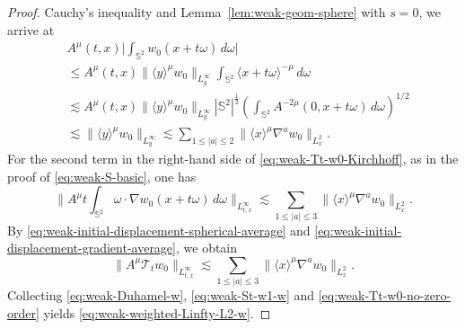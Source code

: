 \documentclass[11pt,twoside]{article}
\def\f{\frac}
\def\ls{\lesssim}
\newcommand{\Sph}{\mathbb{S}^2}
\theoremstyle{plain}
\theoremstyle{definition}
\theoremstyle{assumption}
\numberwithin{equation}{section}
\begin{document}
\begin{proof}
				Cauchy's inequality and Lemma~\ref{lem:weak-geom-sphere} with \(s=0\),
				we arrive at
				\begin{equation}
					\label{eq:weak-initial-displacement-spherical-average}
					\begin{aligned}
						&
						A^\mu(t,x)
						\big|
						\int_{\mathbb S^2}
						w_0(x+t\omega)\,d\omega
						\big|
						\\
						&\le
						A^\mu(t,x)
						\|\langle y\rangle^\mu w_0\|_{L^\infty_y}
						\int_{\mathbb S^2}
						\langle x+t\omega\rangle^{-\mu}\,d\omega
						\\
						&\lesssim
						A^\mu(t,x)
						\|\langle y\rangle^\mu w_0\|_{L^\infty_y}
						|\Sph|^{\f12}
						\left(
						\int_{\mathbb S^2}
						A^{-2\mu}(0,x+t\omega)\,d\omega
						\right)^{1/2}
						\\
						&\ls
						\|\langle y\rangle^\mu w_0\|_{L^\infty_y}
						\ls
						\sum_{1\le |a|\le2}
						\|\langle x\rangle^\mu\nabla^a w_0\|_{L^2_x}.
					\end{aligned}
				\end{equation}
				For the second term in the right-hand side of
				\eqref{eq:weak-Tt-w0-Kirchhoff}, as in the proof of
				\eqref{eq:weak-S-basic}, one has
				\begin{equation}
					\label{eq:weak-initial-displacement-gradient-average}
					\big\|
					A^\mu
					t
					\int_{\mathbb S^2}
					\omega\cdot\nabla w_0(x+t\omega)\,d\omega
					\big\|_{L^\infty_{t,x}}
					\ls
					\sum_{1\le |a|\le3}
					\|\langle x\rangle^\mu\nabla^a w_0\|_{L^2_x}.
				\end{equation}
				By \eqref{eq:weak-initial-displacement-spherical-average} and
				\eqref{eq:weak-initial-displacement-gradient-average}, we obtain
				\begin{equation}
					\label{eq:weak-Tt-w0-no-zero-order}
					\|A^\mu\mathcal T_t w_0\|_{L^\infty_{t,x}}
					\ls
					\sum_{1\le |a|\le3}
					\|\langle x\rangle^\mu\nabla^a w_0\|_{L^2_x}.
				\end{equation}
				Collecting \eqref{eq:weak-Duhamel-w}, \eqref{eq:weak-St-w1-w} and
				\eqref{eq:weak-Tt-w0-no-zero-order} yields
				\eqref{eq:weak-weighted-Linfty-L2-w}.
				

\end{proof}
\end{document}

